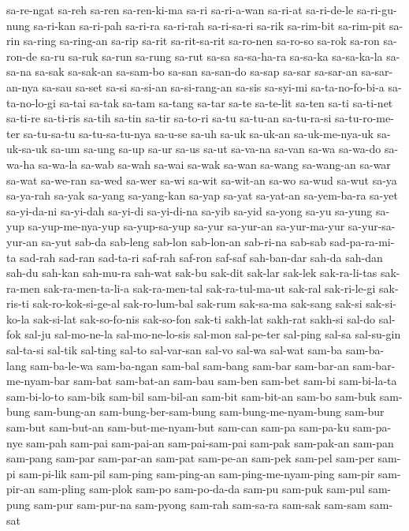 {sa-re-ngat sa-reh sa-ren sa-ren-ki-ma sa-ri sa-ri-a-wan sa-ri-at
sa-ri-de-le sa-ri-gu-nung sa-ri-kan sa-ri-pah sa-ri-ra sa-ri-rah
sa-ri-sa-ri sa-rik sa-rim-bit sa-rim-pit sa-rin sa-ring sa-ring-an sa-rip
sa-rit sa-rit-sa-rit sa-ro-nen sa-ro-so sa-rok sa-ron sa-ron-de sa-ru
sa-ruk sa-run sa-rung sa-rut sa-sa sa-sa-ha-ra sa-sa-ka sa-sa-ka-la
sa-sa-na sa-sak sa-sak-an sa-sam-bo sa-san sa-san-do sa-sap sa-sar
sa-sar-an sa-sar-an-nya sa-sau sa-set sa-si sa-si-an sa-si-rang-an sa-sis
sa-syi-mi sa-ta-no-fo-bi-a sa-ta-no-lo-gi sa-tai sa-tak sa-tam sa-tang
sa-tar sa-te sa-te-lit sa-ten sa-ti sa-ti-net sa-ti-re sa-ti-ris sa-tih
sa-tin sa-tir sa-to-ri sa-tu sa-tu-an sa-tu-ra-si sa-tu-ro-me-ter
sa-tu-sa-tu sa-tu-sa-tu-nya sa-u-se sa-uh sa-uk sa-uk-an sa-uk-me-nya-uk
sa-uk-sa-uk sa-um sa-ung sa-up sa-ur sa-us sa-ut sa-va-na sa-van sa-wa
sa-wa-do sa-wa-ha sa-wa-la sa-wab sa-wah sa-wai sa-wak sa-wan sa-wang
sa-wang-an sa-war sa-wat sa-we-ran sa-wed sa-wer sa-wi sa-wit sa-wit-an
sa-wo sa-wud sa-wut sa-ya sa-ya-rah sa-yak sa-yang sa-yang-kan sa-yap
sa-yat sa-yat-an sa-yem-ba-ra sa-yet sa-yi-da-ni sa-yi-dah sa-yi-di
sa-yi-di-na sa-yib sa-yid sa-yong sa-yu sa-yung sa-yup sa-yup-me-nya-yup
sa-yup-sa-yup sa-yur sa-yur-an sa-yur-ma-yur sa-yur-sa-yur-an sa-yut
sab-da sab-leng sab-lon sab-lon-an sab-ri-na sab-sab sad-pa-ra-mi-ta
sad-rah sad-ran sad-ta-ri saf-rah saf-ron saf-saf sah-ban-dar sah-da
sah-dan sah-du sah-kan sah-mu-ra sah-wat sak-bu sak-dit sak-lar sak-lek
sak-ra-li-tas sak-ra-men sak-ra-men-ta-li-a sak-ra-men-tal
sak-ra-tul-ma-ut sak-ral sak-ri-le-gi sak-ris-ti sak-ro-kok-si-ge-al
sak-ro-lum-bal sak-rum sak-sa-ma sak-sang sak-si sak-si-ko-la sak-si-lat
sak-so-fo-nis sak-so-fon sak-ti sakh-lat sakh-rat sakh-si sal-do sal-fok
sal-ju sal-mo-ne-la sal-mo-ne-lo-sis sal-mon sal-pe-ter sal-ping sal-sa
sal-su-gin sal-ta-si sal-tik sal-ting sal-to sal-var-san sal-vo sal-wa
sal-wat sam-ba sam-ba-lang sam-ba-le-wa sam-ba-ngan sam-bal sam-bang
sam-bar sam-bar-an sam-bar-me-nyam-bar sam-bat sam-bat-an sam-bau sam-ben
sam-bet sam-bi sam-bi-la-ta sam-bi-lo-to sam-bik sam-bil sam-bil-an
sam-bit sam-bit-an sam-bo sam-buk sam-bung sam-bung-an
sam-bung-ber-sam-bung sam-bung-me-nyam-bung sam-bur sam-but sam-but-an
sam-but-me-nyam-but sam-can sam-pa sam-pa-ku sam-pa-nye sam-pah sam-pai
sam-pai-an sam-pai-sam-pai sam-pak sam-pak-an sam-pan sam-pang sam-par
sam-par-an sam-pat sam-pe-an sam-pek sam-pel sam-per sam-pi sam-pi-lik
sam-pil sam-ping sam-ping-an sam-ping-me-nyam-ping sam-pir sam-pir-an
sam-pling sam-plok sam-po sam-po-da-da sam-pu sam-puk sam-pul sam-pung
sam-pur sam-pur-na sam-pyong sam-rah sam-sa-ra sam-sak sam-sam sam-sat
}
